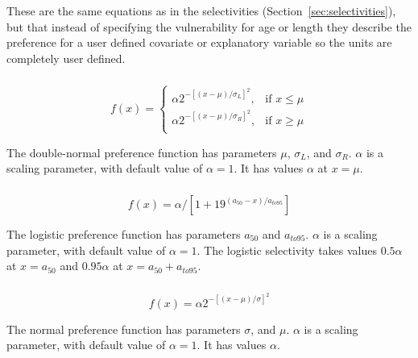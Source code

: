 These are the same equations as in the selectivities (Section~\ref{sec:selectivities}), but that instead of specifying the vulnerability for age or length they describe the preference for a user defined covariate or explanatory variable so the units are completely user defined.
\subsubsection[Double-normal]{}

\begin{equation}
f(x) = \begin{cases}
\alpha 2^{-[(x- \mu)/\sigma_L ]^2}, & \text{if $x \leq \mu$} \\
\alpha 2^{-[(x- \mu)/\sigma_R ]^2}, & \text{if $x \ge \mu$}\\
\end{cases}
\end{equation} 

The double-normal preference function has parameters $\mu$, $\sigma_L$, and $\sigma_R$. $\alpha$ is a scaling parameter, with default value of $\alpha = 1$. It has values $\alpha$ at $x=\mu$.

\subsubsection[Logistic]{}

\begin{equation}
f(x) = \alpha / [1+19^{(a_{50}-x)/a_{to95}}]
\end{equation}

The logistic preference function has parameters $a_{50}$ and $a_{to95}$. $\alpha$ is a scaling parameter, with default value of $\alpha = 1$. The logistic selectivity takes values $0.5 \alpha$ at $x=a_{50}$ and $0.95 \alpha$ at $x=a_{50}+a_{to95}$. 

\subsubsection[Normal]{}

\begin{equation}
f(x) = 
\alpha 2^{-[(x- \mu)/\sigma]^2}
\end{equation} 

The normal preference function has parameters  $\sigma$, and $\mu$. $\alpha$ is a scaling parameter, with default value of $\alpha = 1$. It has values $\alpha$.

